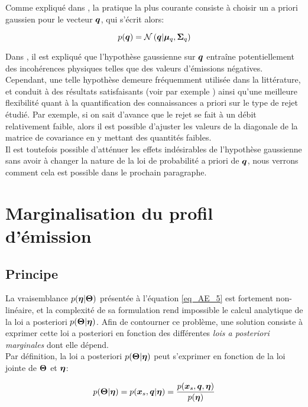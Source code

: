 Comme expliqué dans \cite{Winiarek2011}, la pratique la plus courante consiste à choisir un a priori gaussien pour le vecteur ${\bm{q}}$, qui s'écrit alors:

\begin{equation}
p({\bm{q}}) = \mathcal{N}\left({\bm{q}} \middle \vert {\bm{\mu}_q}, {\bm{\Sigma}_q}\right)
\label{eq_AE_8}
\end{equation}

Dans \cite{Bocquet2008}, il est expliqué que l'hypothèse gaussienne sur ${\bm{q}}$ entraîne potentiellement des incohérences physiques telles que des valeurs d'émissions négatives. Cependant, une telle hypothèse demeure fréquemment utilisée dans la littérature, et conduit à des résultats satisfaisants (voir par exemple \cite{Issartel2003}) ainsi qu'une meilleure flexibilité quant à la quantification des connaissances a priori sur le type de rejet étudié. Par exemple, si on sait d'avance que le rejet se fait à un débit relativement faible, alors il est possible d'ajuster les valeurs de la diagonale de la matrice de covariance en y mettant des quantités faibles. \\

Il est toutefois possible d'atténuer les effets indésirables de l'hypothèse gaussienne sans avoir à changer la nature de la loi de probabilité a priori de ${\bm{q}}$, nous verrons comment cela est possible dans le prochain paragraphe.


\section{Marginalisation du profil d'émission}

\subsection{Principe}
La vraisemblance $p({\bm{\eta}}|{\bm{\Theta}})$ présentée à l'équation \eqref{eq_AE_5} est fortement non-linéaire, et la complexité de sa formulation rend impossible le calcul analytique de la loi a posteriori $p({\bm{\Theta}} | {\bm{\eta}})$. Afin de contourner ce problème, une solution consiste à exprimer cette loi a posteriori en fonction des différentes \textit{lois a posteriori marginales} dont elle dépend. \\

Par définition, la loi a posteriori $p({\bm{\Theta}}|{\bm{\eta}})$ peut s'exprimer en fonction de la loi jointe de ${\bm{\Theta}}$ et ${\bm{\eta}}$:

\begin{equation}
p({\bm{\Theta}}|{\bm{\eta}}) = p({\bm{x}_s}, {\bm{q}} | {\bm{\eta}}) = \dfrac{p({\bm{x}_s}, {\bm{q}}, {\bm{\eta}})}{p({\bm{\eta}})}
\label{eq_conditionalite}
\end{equation}

